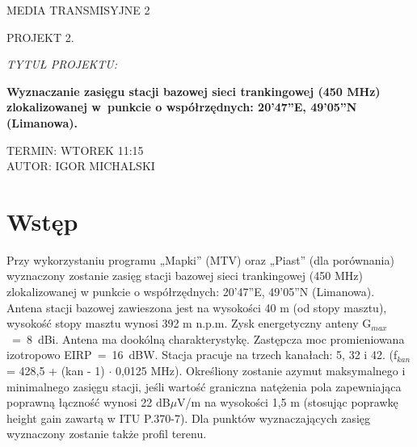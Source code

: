 \documentclass[12pt, a4paper, oneside]{article}
\begin{document}
\begin{titlepage}
\vspace*{7\baselineskip}
\begin{center}
{\Huge MEDIA TRANSMISYJNE 2}
\end{center}
\vspace*{\baselineskip}
\begin{center}
{\Large PROJEKT 2.}
\end{center}
\vspace*{5\baselineskip}
{\it TYTUŁ PROJEKTU:}
\begin{center}
{\bf\large Wyznaczanie zasięgu stacji bazowej sieci trankingowej (450 MHz) zlokalizowanej w~punkcie o współrzędnych: 20’47”E, 49’05”N (Limanowa).} 
\end{center}
\vspace*{10\baselineskip}
\raggedleft
TERMIN: WTOREK 11:15\\
AUTOR: IGOR MICHALSKI
\end{titlepage}
\section{Wstęp}
\indent\indent Przy wykorzystaniu programu „Mapki” (MTV) oraz „Piast” (dla porównania) wyznaczony zostanie zasięg stacji bazowej sieci trankingowej (450 MHz) zlokalizowanej w punkcie o współrzędnych: 20’47”E, 49’05”N (Limanowa). Antena stacji bazowej zawieszona jest na wysokości 40 m (od stopy masztu), wysokość stopy masztu wynosi 392 m n.p.m. Zysk energetyczny anteny G$_{max}$~=~8~dBi. Antena ma dookólną charakterystykę. Zastępcza moc promieniowana izotropowo EIRP~=~16~dBW. Stacja pracuje na trzech kanałach: 5, 32 i 42. (f$_{kan}$ = 428,5 + (kan - 1) $\cdot$ 0,0125 MHz). Określiony zostanie azymut maksymalnego i minimalnego  zasięgu  stacji,  jeśli  wartość  graniczna natężenia  pola  zapewniająca  poprawną łączność wynosi 22 dB$\mu$V/m na wysokości 1,5 m (stosując poprawkę height gain zawartą w ITU P.370-7). Dla punktów wyznaczających zasięg wyznaczony zostanie także profil terenu.
\end{document}
